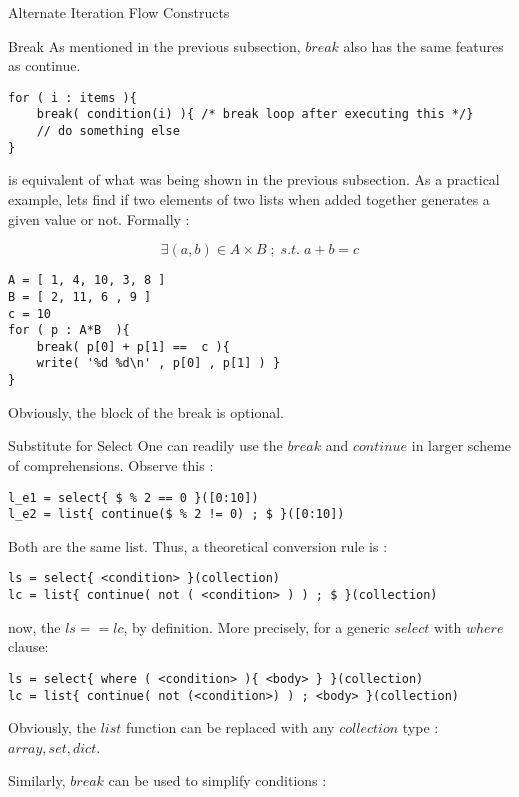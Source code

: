 \begin{section}{Alternate Iteration Flow Constructs}
\begin{subsection}{Break}
As mentioned in the previous subsection, 
$break$ also has the same features as continue. 

\begin{lstlisting}[style=JexlStyle]
for ( i : items ){
    break( condition(i) ){ /* break loop after executing this */} 
    // do something else 
}
\end{lstlisting}
is equivalent of what was being shown in the previous subsection.
As a practical example, lets find if two elements of two lists
when added together generates a given value or not.
Formally :

$$
\exists (a,b) \in A \times B \; ; \; s.t. \; a + b = c  
$$

\begin{lstlisting}[style=JexlStyle]
A = [ 1, 4, 10, 3, 8 ]
B = [ 2, 11, 6 , 9 ]
c = 10 
for ( p : A*B  ){
    break( p[0] + p[1] ==  c ){ 
    write( '%d %d\n' , p[0] , p[1] ) } 
}
\end{lstlisting}
Obviously, the block of the break is optional.
\end{subsection}

\begin{subsection}{Substitute for Select}
One can readily use the $break$ and $continue$ in larger scheme of comprehensions.
Observe this :

\begin{lstlisting}[style=JexlStyle]
l_e1 = select{ $ % 2 == 0 }([0:10])
l_e2 = list{ continue($ % 2 != 0) ; $ }([0:10])
\end{lstlisting}
Both are the same list. Thus, a theoretical conversion rule is :

\begin{lstlisting}[style=JexlStyle]
ls = select{ <condition> }(collection)
lc = list{ continue( not ( <condition> ) ) ; $ }(collection)
\end{lstlisting}
now, the $ls == lc$, by definition.
More precisely, for a generic $select$ with $where$ clause:

\begin{lstlisting}[style=JexlStyle]
ls = select{ where ( <condition> ){ <body> } }(collection)
lc = list{ continue( not (<condition>) ) ; <body> }(collection)
\end{lstlisting}
Obviously, the $list$ function can be replaced with any $collection$ type : $array, set, dict$.

Similarly, $break$ can be used to simplify conditions :


\end{subsection}
\end{section}

